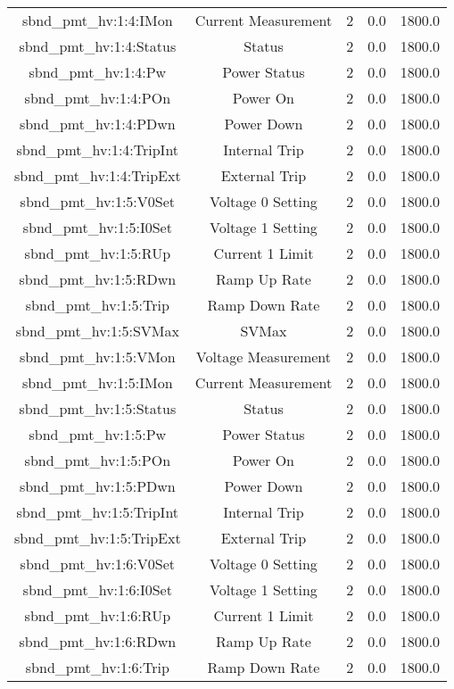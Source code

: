 \begin{center}
\begin{longtable}{c | c c c c }
sbnd\_pmt\_hv:1:4:IMon & Current Measurement & 2 & 0.0 & 1800.0\\ 
sbnd\_pmt\_hv:1:4:Status & Status & 2 & 0.0 & 1800.0\\ 
sbnd\_pmt\_hv:1:4:Pw & Power Status & 2 & 0.0 & 1800.0\\ 
sbnd\_pmt\_hv:1:4:POn & Power On & 2 & 0.0 & 1800.0\\ 
sbnd\_pmt\_hv:1:4:PDwn & Power Down & 2 & 0.0 & 1800.0\\ 
sbnd\_pmt\_hv:1:4:TripInt & Internal Trip & 2 & 0.0 & 1800.0\\ 
sbnd\_pmt\_hv:1:4:TripExt & External Trip & 2 & 0.0 & 1800.0\\ 
sbnd\_pmt\_hv:1:5:V0Set & Voltage 0 Setting & 2 & 0.0 & 1800.0\\ 
sbnd\_pmt\_hv:1:5:I0Set & Voltage 1 Setting & 2 & 0.0 & 1800.0\\ 
sbnd\_pmt\_hv:1:5:RUp & Current 1 Limit & 2 & 0.0 & 1800.0\\ 
sbnd\_pmt\_hv:1:5:RDwn & Ramp Up Rate & 2 & 0.0 & 1800.0\\ 
sbnd\_pmt\_hv:1:5:Trip & Ramp Down Rate & 2 & 0.0 & 1800.0\\ 
sbnd\_pmt\_hv:1:5:SVMax & SVMax & 2 & 0.0 & 1800.0\\ 
sbnd\_pmt\_hv:1:5:VMon & Voltage Measurement & 2 & 0.0 & 1800.0\\ 
sbnd\_pmt\_hv:1:5:IMon & Current Measurement & 2 & 0.0 & 1800.0\\ 
sbnd\_pmt\_hv:1:5:Status & Status & 2 & 0.0 & 1800.0\\ 
sbnd\_pmt\_hv:1:5:Pw & Power Status & 2 & 0.0 & 1800.0\\ 
sbnd\_pmt\_hv:1:5:POn & Power On & 2 & 0.0 & 1800.0\\ 
sbnd\_pmt\_hv:1:5:PDwn & Power Down & 2 & 0.0 & 1800.0\\ 
sbnd\_pmt\_hv:1:5:TripInt & Internal Trip & 2 & 0.0 & 1800.0\\ 
sbnd\_pmt\_hv:1:5:TripExt & External Trip & 2 & 0.0 & 1800.0\\ 
sbnd\_pmt\_hv:1:6:V0Set & Voltage 0 Setting & 2 & 0.0 & 1800.0\\ 
sbnd\_pmt\_hv:1:6:I0Set & Voltage 1 Setting & 2 & 0.0 & 1800.0\\ 
sbnd\_pmt\_hv:1:6:RUp & Current 1 Limit & 2 & 0.0 & 1800.0\\ 
sbnd\_pmt\_hv:1:6:RDwn & Ramp Up Rate & 2 & 0.0 & 1800.0\\ 
sbnd\_pmt\_hv:1:6:Trip & Ramp Down Rate & 2 & 0.0 & 1800.0\\ 

\end{longtable}
\end{center}

